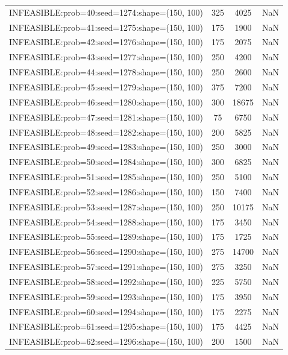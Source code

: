 \begin{longtable}{lccc}
INFEASIBLE:prob=40:seed=1274:shape=(150, 100)  &      325 &  4025 &    NaN \\
INFEASIBLE:prob=41:seed=1275:shape=(150, 100)  &      175 &  1900 &    NaN \\
INFEASIBLE:prob=42:seed=1276:shape=(150, 100)  &      175 &  2075 &    NaN \\
INFEASIBLE:prob=43:seed=1277:shape=(150, 100)  &      250 &  4200 &    NaN \\
INFEASIBLE:prob=44:seed=1278:shape=(150, 100)  &      250 &  2600 &    NaN \\
INFEASIBLE:prob=45:seed=1279:shape=(150, 100)  &      375 &  7200 &    NaN \\
INFEASIBLE:prob=46:seed=1280:shape=(150, 100)  &      300 & 18675 &    NaN \\
INFEASIBLE:prob=47:seed=1281:shape=(150, 100)  &       75 &  6750 &    NaN \\
INFEASIBLE:prob=48:seed=1282:shape=(150, 100)  &      200 &  5825 &    NaN \\
INFEASIBLE:prob=49:seed=1283:shape=(150, 100)  &      250 &  3000 &    NaN \\
INFEASIBLE:prob=50:seed=1284:shape=(150, 100)  &      300 &  6825 &    NaN \\
INFEASIBLE:prob=51:seed=1285:shape=(150, 100)  &      250 &  5100 &    NaN \\
INFEASIBLE:prob=52:seed=1286:shape=(150, 100)  &      150 &  7400 &    NaN \\
INFEASIBLE:prob=53:seed=1287:shape=(150, 100)  &      250 & 10175 &    NaN \\
INFEASIBLE:prob=54:seed=1288:shape=(150, 100)  &      175 &  3450 &    NaN \\
INFEASIBLE:prob=55:seed=1289:shape=(150, 100)  &      175 &  1725 &    NaN \\
INFEASIBLE:prob=56:seed=1290:shape=(150, 100)  &      275 & 14700 &    NaN \\
INFEASIBLE:prob=57:seed=1291:shape=(150, 100)  &      275 &  3250 &    NaN \\
INFEASIBLE:prob=58:seed=1292:shape=(150, 100)  &      225 &  5750 &    NaN \\
INFEASIBLE:prob=59:seed=1293:shape=(150, 100)  &      175 &  3950 &    NaN \\
INFEASIBLE:prob=60:seed=1294:shape=(150, 100)  &      175 &  2275 &    NaN \\
INFEASIBLE:prob=61:seed=1295:shape=(150, 100)  &      175 &  4425 &    NaN \\
INFEASIBLE:prob=62:seed=1296:shape=(150, 100)  &      200 &  1500 &    NaN \\

\end{longtable}
